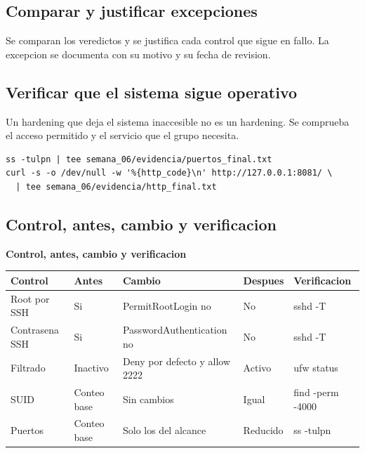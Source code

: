 \documentclass[11pt,a4paper]{article}
\begin{document}
\subsection{Comparar y justificar excepciones}

Se comparan los veredictos y se justifica cada control que sigue en fallo. La excepcion se documenta con su motivo y su fecha de revision.

\subsection{Verificar que el sistema sigue operativo}

Un hardening que deja el sistema inaccesible no es un hardening. Se comprueba el acceso permitido y el servicio que el grupo necesita.

\begin{lstlisting}[style=estiloCodigo]
ss -tulpn | tee semana_06/evidencia/puertos_final.txt
curl -s -o /dev/null -w '%{http_code}\n' http://127.0.0.1:8081/ \
  | tee semana_06/evidencia/http_final.txt
\end{lstlisting}

\subsection{Control, antes, cambio y verificacion}

\begin{center}
\begin{minipage}{\linewidth}
\centering
{\footnotesize
\textbf{Control, antes, cambio y verificacion}\par\smallskip
\begin{tabular}{@{}>{\raggedright\arraybackslash}p{2.80cm}>{\raggedright\arraybackslash}p{2.20cm}>{\raggedright\arraybackslash}p{3.40cm}>{\raggedright\arraybackslash}p{2.20cm}>{\raggedright\arraybackslash}p{3.40cm}@{}}
\toprule
\textbf{Control} & \textbf{Antes} & \textbf{Cambio} & \textbf{Despues} & \textbf{Verificacion} \\
\midrule
Root por SSH & Si & PermitRootLogin no & No & sshd -T \\
Contrasena SSH & Si & PasswordAuthentication no & No & sshd -T \\
Filtrado & Inactivo & Deny por defecto y allow 2222 & Activo & ufw status \\
SUID & Conteo base & Sin cambios & Igual & find -perm -4000 \\
Puertos & Conteo base & Solo los del alcance & Reducido & ss -tulpn \\
\bottomrule
\end{tabular}
}
\par{}
\end{minipage}
\end{center}
\end{document}
